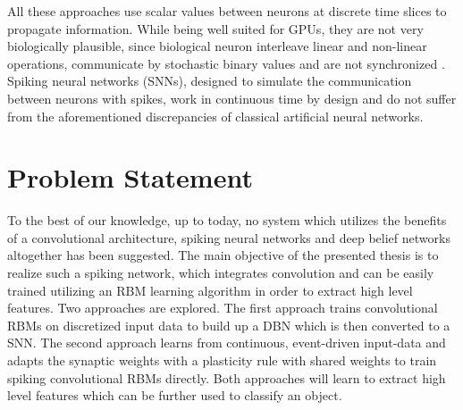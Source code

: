 All these approaches use scalar values between neurons at discrete time slices to propagate information. 
While being well suited for GPUs, they are not very biologically plausible, since biological neuron interleave linear and non-linear operations, communicate by stochastic binary values and are not synchronized \cite{bengio2015towards}. 
Spiking neural networks (SNNs), designed to simulate the communication between neurons with spikes, work in continuous time by design and do not suffer from the aforementioned discrepancies of classical artificial neural networks.

\section{Problem Statement} \label{c:probstate}

To the best of our knowledge, up to today, no system which utilizes the benefits of a convolutional architecture, spiking neural networks and deep belief networks altogether has been suggested. 
The main objective of the presented thesis is to realize such a spiking network, which integrates convolution and can be easily trained utilizing an RBM learning algorithm in order to extract high level features. 
Two approaches are explored. 
The first approach trains convolutional RBMs on discretized input data to build up a DBN which is then converted to a SNN. 
The second approach learns from continuous, event-driven input-data and adapts the synaptic weights with a plasticity rule with shared weights to train spiking convolutional RBMs directly. 
Both approaches will learn to extract high level features which can be further used to classify an object. 

%
%
%


